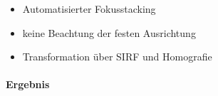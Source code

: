 \documentclass[./00PhotoBox.tex]{subfiles}
\begin{document}
\begin{itemize}
    \item Automatisierter Fokusstacking
    \item keine Beachtung der festen Ausrichtung
    \item Transformation über SIRF und Homografie
\end{itemize}


\paragraph{Ergebnis}

\biblio
\end{document}
